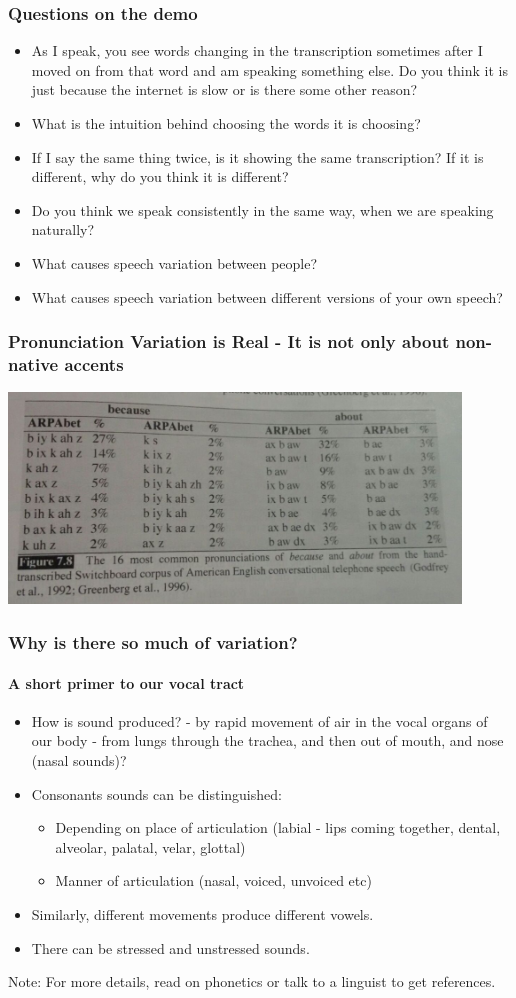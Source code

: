 \documentclass{beamer}
\begin{document}
\begin{frame}
\frametitle{Questions on the demo}
\begin{itemize}
\item As I speak, you see words changing in the transcription sometimes after I moved on from that word and am speaking something else. Do you think it is just because the internet is slow or is there some other reason? \pause
\item What is the intuition behind choosing the words it is choosing? \pause
\item If I say the same thing twice, is it showing the same transcription? If it is different, why do you think it is different? \pause
\item Do you think we speak consistently in the same way, when we are speaking naturally? \pause
\item What causes speech variation between people? \pause
\item What causes speech variation between different versions of your own speech?
\end{itemize}
\end{frame}

\begin{frame}
\frametitle{Pronunciation Variation is Real - It is not only about non-native accents}
\includegraphics[width=0.9\textwidth]{because-about.jpeg}
\end{frame}

\begin{frame}
\frametitle{Why is there so much of variation?}
\framesubtitle{A short primer to our vocal tract}
\begin{itemize}
\item How is sound produced? - by rapid movement of air in the vocal organs of our body - from lungs through the trachea, and then out of mouth, and nose (nasal sounds)?
\item Consonants sounds can be distinguished:
\begin{itemize}
\item Depending on place of articulation (labial - lips coming together, dental, alveolar, palatal, velar, glottal)
\item Manner of articulation (nasal, voiced, unvoiced etc)
\end{itemize}
\item Similarly, different movements produce different vowels.
\item There can be stressed and unstressed sounds. 
\end{itemize}
Note: For more details, read on phonetics or talk to a linguist to get references.
\end{frame}
\end{document}
